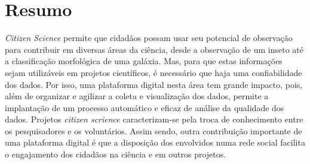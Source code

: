 \section*{Resumo}

\emph{Citizen Science} permite que cidadãos possam usar seu potencial de observação para contribuir em diversas áreas da ciência, desde a observação de um inseto até a classificação morfológica de uma galáxia. Mas, para que estas informações sejam utilizáveis em projetos científicos, é necessário que haja uma confiabilidade dos dados. Por isso, uma plataforma digital nesta área tem grande impacto, pois, além de organizar e agilizar a coleta e visualização dos dados, permite a implantação de um processo automático e eficaz de análise da qualidade dos dados. Projetos \emph{citizen scrience} caracterizam-se pela troca de conhecimento entre os pesquisadores e os voluntários. Assim sendo, outra contribuição importante de uma plataforma digital é que a disposição dos envolvidos numa rede social facilita o engajamento dos cidadãos na ciência e em outros projetos.